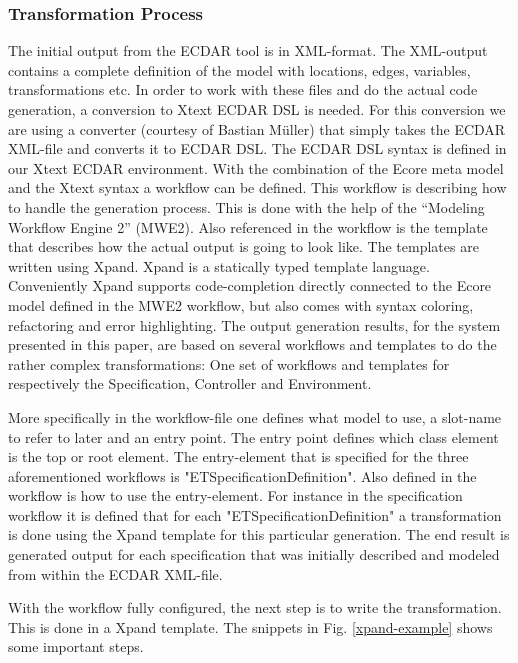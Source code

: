 \subsubsection{Transformation Process}
\label{transformation-process}

The initial output from the ECDAR tool is in XML-format. The XML-output
contains a complete definition of the model with locations, edges, variables,
transformations etc. In order to work with these files and do the actual code
generation, a conversion to Xtext ECDAR DSL is needed. For this conversion we
are using a converter (courtesy of Bastian M\"uller) that simply takes the ECDAR XML-file and converts it to ECDAR DSL. The ECDAR DSL syntax is defined in our Xtext ECDAR
environment. With the combination of the Ecore meta model and the Xtext syntax a
workflow can be defined. This workflow is describing how to handle the
generation process. This is done with the help of the ``Modeling Workflow Engine 2''
(MWE2). Also referenced in the workflow is the template that describes how the
actual output is going to look like. The templates are written using
Xpand. Xpand is a statically typed template language. Conveniently Xpand
supports code-completion directly connected to the Ecore model defined in the
MWE2 workflow, but also comes with syntax coloring, refactoring and error
highlighting. The output generation results, for the system presented in this
paper, are based on several workflows and templates to do the rather complex
transformations: One set of workflows and templates for respectively the
Specification, Controller and Environment.

More specifically in the workflow-file one defines what model to use, a
slot-name to refer to later and an entry point. The entry point defines which
class element is the top or root element. The entry-element that is specified for
the three aforementioned workflows is "ETSpecificationDefinition". Also defined
in the workflow is how to use the entry-element. For instance in the
specification workflow it is defined that for each "ETSpecificationDefinition" a
transformation is done using the Xpand template for this particular
generation. The end result is generated output for each specification that
was initially described and modeled from within the ECDAR XML-file.

With the workflow fully configured, the next step is to write the
transformation. This is done in a Xpand template. The snippets in Fig.
\ref{xpand-example} shows some important steps.

